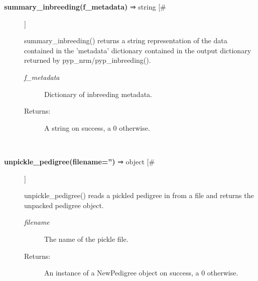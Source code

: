 \begin{description}
\item[\textbf{summary\_inbreeding(f\_metadata)} ⇒ string [\#]
]
\par summary\_inbreeding() returns a string representation of the data contained in
the 'metadata' dictionary contained in the output dictionary returned by
pyp\_nrm/pyp\_inbreeding().
\begin{description}
\item[\textit{f\_metadata}
]
Dictionary of inbreeding metadata.
\item[Returns:
]
A string on success, a 0 otherwise.
\end{description}\\

\item[\textbf{unpickle\_pedigree(filename='')} ⇒ object [\#]
]
\par unpickle\_pedigree() reads a pickled pedigree in from a file and returns the unpacked
pedigree object.
\begin{description}
\item[\textit{filename}
]
The name of the pickle file.
\item[Returns:
]
An instance of a NewPedigree object on success, a 0 otherwise.
\end{description}\\

\end{description}
